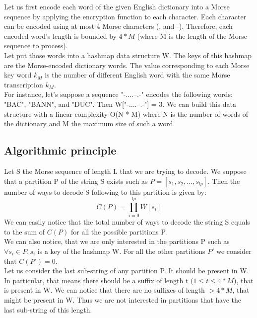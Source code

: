 \documentclass[a4paper]{article}
\begin{document}
Let us first encode each word of the given English dictionary into a Morse sequence by applying the encryption function to each character. Each character can be encoded using at most 4 Morse characters (. and -). Therefore, each encoded word's length is bounded by $4 * M$ (where M is the length of the Morse sequence to process).\\

Let put those words into a hashmap data structure W. The keys of this hashmap are the Morse-encoded dictionary words.  The value corresponding to each Morse key word $k_{M}$ is the number of different English word with the same Morse transcription $k_{M}$.\\

For instance, let's suppose a sequence "-....--.-" encodes the following words: "BAC", "BANN", and "DUC". Then W["-....--.-"] = 3. We can build this data structure with a linear complexity O(N * M) where N is the number of words of the dictionary and M the maximum size of such a word.



\subsection{Algorithmic principle}

Let S the Morse sequence of length L that we are trying to decode.   We suppose that a partition P of the string S exists such as $P = [s_{1}, s_{2}, ..., s_{lp}]$. Then the number of ways to decode S following to this partition is given by:
\begin{equation*}
	C(P) = \prod_{i=0}^{lp}{W[s_i]}
\end{equation*}
We can easily notice that the total number of ways to decode the string S equals to the sum of $C(P)$ for all the possible partitions P.\\
We can also notice, that we are only interested in the partitions P such as $\forall s_{i} \in P, s_{i}$ is a key of the hashmap W.  For all the other partitions $P'$ we consider that $C(P') = 0$.\\

Let us consider the last sub-string of any partition P. It should be present in W. In particular, that means there should be a suffix of length t ($1 \leq t \leq 4 * M$), that is present in W. We can notice that there are no suffixes of length $> 4 * M$, that might be present in W.   Thus we are not interested in partitions that have the last sub-string of this length.
\end{document}
